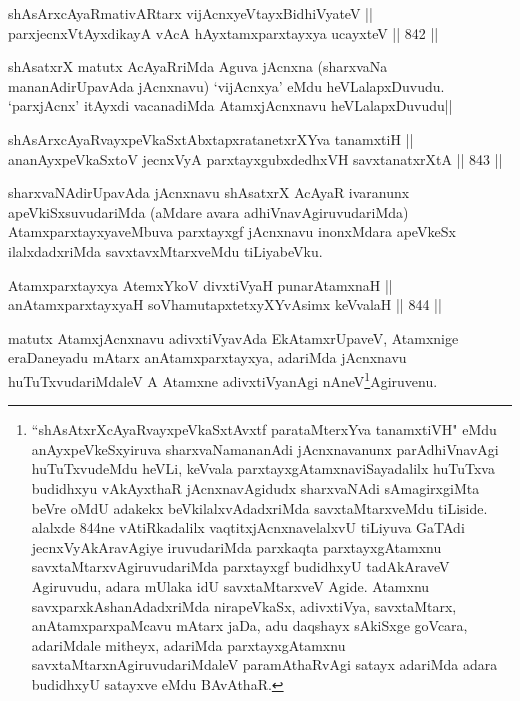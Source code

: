 
\begin{shl}
shAsArxcAyaRmativAR\s tarx vijAcnxyeVtayxBidhiVyateV || \\
parxjecnxVtAyxdikayA vAcA hAyxtamxparxtayxya ucayxteV \hfill || 842 ||  
\end{shl}

\begin{artha}
shAsatxrX matutx AcAyaRriMda Aguva jAcnxna (sharxvaNa mananAdirUpavAda jAcnxnavu) `vijAcnxya' eMdu heVLalapxDuvudu. `parxjAcnx' itAyxdi vacanadiMda AtamxjAcnxnavu heVLalapxDuvudu||
\end{artha}


\begin{shl}
shAsArxcAyaRvayxpeVkaSxtAbxtapxratanetxrXYva tanamxtiH || \\
ananAyxpeVkaSxtoV jecnxVyA parxtayxgubxdedhxVH savxtanatxrXtA \hfill || 843 ||  
\end{shl}

\begin{artha}
sharxvaNAdirUpavAda jAcnxnavu shAsatxrX AcAyaR ivaranunx apeVkiSxsuvudariMda (aMdare avara adhiVnavAgiruvudariMda) AtamxparxtayxyaveMbuva parxtayxgf jAcnxnavu inonxMdara apeVkeSx ilalxdadxriMda savxtavxMtarxveMdu tiLiyabeVku.
\end{artha}

\begin{shl}
Atamxparxtayxya AtemxYkoV divxtiVyaH punarAtamxnaH || \\
anAtamxparxtayxyaH soV\s hamutapxtetxyXYvAsimx keVvalaH \hfill || 844 ||  
\end{shl}

\begin{artha}
matutx AtamxjAcnxnavu adivxtiVyavAda EkAtamxrUpaveV, Atamxnige eraDaneyadu mAtarx anAtamxparxtayxya, adariMda jAcnxnavu huTuTxvudariMdaleV A Atamxne adivxtiVyanAgi nAneV\footnote{``shAsAtxrXcAyaRvayxpeVkaSxtAvxtf parataMterxYva tanamxtiVH" eMdu anAyxpeVkeSxyiruva sharxvaNamananAdi jAcnxnavanunx parAdhiVnavAgi huTuTxvudeMdu heVLi, keVvala parxtayxgAtamxnaviSayadalilx huTuTxva budidhxyu vAkAyxthaR jAcnxnavAgidudx sharxvaNAdi sAmagirxgiMta beVre oMdU adakekx beVkilalxvAdadxriMda savxtaMtarxveMdu tiLiside. alalxde 844ne vAtiRkadalilx vaqtitxjAcnxnavelalxvU tiLiyuva GaTAdi jecnxVyAkAravAgiye iruvudariMda parxkaqta parxtayxgAtamxnu savxtaMtarxvAgiruvudariMda parxtayxgf budidhxyU tadAkAraveV Agiruvudu, adara mUlaka idU savxtaMtarxveV Agide. Atamxnu savxparxkAshanAdadxriMda nirapeVkaSx, adivxtiVya, savxtaMtarx, anAtamxparxpaMcavu mAtarx jaDa, adu daqshayx sAkiSxge goVcara, adariMdale mitheyx, adariMda parxtayxgAtamxnu savxtaMtarxnAgiruvudariMdaleV paramAthaRvAgi satayx adariMda adara budidhxyU satayxve eMdu BAvAthaR.}Agiruvenu.
\end{artha}

